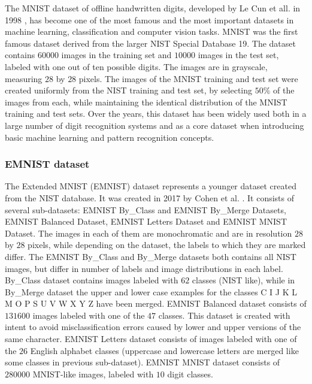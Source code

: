 \documentclass[eng]{simposium}
\begin{document}
The MNIST dataset of offline handwritten digits, developed by Le Cun et all. in 1998 \cite{8}, 
has become one of the most famous and the most important datasets in machine learning,  
classification and computer vision tasks.  
MNIST was the first famous dataset derived from the larger NIST Special Database 19.  
The dataset contains $60000$ images in the training set and $10000$ images in the test set, labeled with one out of ten possible digits.  
The images are in grayscale, measuring $28$ by $28$ pixels.  
The images of the MNIST training and test set were created uniformly from the NIST training and test set,  
by selecting $50\%$ of the images from each, while maintaining the identical distribution of the MNIST training and test sets.  
Over the years, this dataset has been widely used both in a large number of digit recognition systems and as a core dataset  
when introducing basic machine learning and pattern recognition concepts.  

\subsubsection{EMNIST dataset} 

The Extended MNIST (EMNIST) dataset represents a younger dataset created from the NIST database.  
It was created in 2017 by Cohen et al. \cite{1}.  
It consists of several sub-datasets: EMNIST By\_Class and EMNIST By\_Merge Datasets, EMNIST Balanced Dataset,  
EMNIST Letters Dataset and EMNIST MNIST Dataset.  
The images in each of them are monochromatic and are in resolution $28$ by $28$ pixels,  
while depending on the dataset, the labels to which they are marked differ.  
The EMNIST By\_Class and By\_Merge datasets both contains all NIST images, but differ in number of labels and image distributions  
in each label. By\_Class dataset contains images labeled with $62$ classes (NIST like), while in By\_Merge dataset  
the upper and lower case examples for the classes C I J K L M O P S U V W X Y Z have been merged.  
EMNIST Balanced dataset consists of $131600$ images labeled with one of the $47$ classes.  
This dataset is created with intent to avoid misclassification errors caused by lower and upper versions of the same character.  
EMNIST Letters dataset consists of images labeled with one of the $26$ English alphabet classes  
(uppercase and lowercase letters are merged like some classes in previous sub-dataset).  
EMNIST MNIST dataset consists of $280000$ MNIST-like images, labeled with $10$ digit classes.  
  
\end{document}
